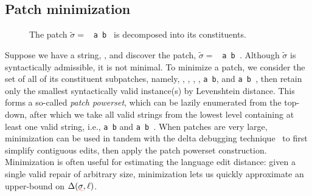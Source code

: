 \documentclass[sigplan,review,anonymous,acmsmall]{acmart}\settopmatter{printfolios=false,printccs=false,printacmref=false}
\begin{document}
  \subsection{Patch minimization}\label{sec:minimization}

  \begin{wrapfigure}{r}{0.45\textwidth}
    \vspace{-20pt}
    \caption{The patch $\tilde{\sigma}=$ \texttt{\hlgreen{(} a \hlorange{+} b \hlgreen{)}} is decomposed into its constituents.}
    \vspace{-20pt}
  \end{wrapfigure}

  Suppose we have a string, \texttt{}, and discover the patch, $\tilde{\sigma}=$ \texttt{\hlgreen{(} a \hlorange{+} b \hlgreen{)}}. Although $\tilde{\sigma}$ is syntactically admissible, it is not minimal. To minimize a patch, we consider the set of all of its constituent subpatches, namely, \texttt{}, \texttt{}, \texttt{}, \texttt{}, \texttt{a \hlorange{+} b}, and \texttt{a \hlgreen{(} b \hlgreen{)}}, then retain only the smallest syntactically valid instance(s) by Levenshtein distance. This forms a so-called \textit{patch powerset}, which can be lazily enumerated from the top-down, after which we take all valid strings from the lowest level containing at least one valid string, i.e., \texttt{a \hlorange{+} b} and \texttt{a \hlgreen{(} b \hlgreen{)}}. When patches are very large, minimization can be used in tandem with the delta debugging technique~\cite{zeller2002isolating} to first simplify contiguous edits, then apply the patch powerset construction. Minimization is often useful for estimating the language edit distance: given a single valid repair of arbitrary size, minimization lets us quickly approximate an upper-bound on $\Delta(\err{\sigma}, \ell)$.
\end{document}
